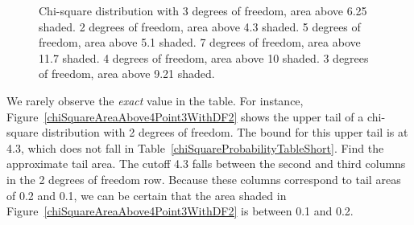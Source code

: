 \begin{figure}
{}
\caption{\textbf{} Chi-square distribution with 3 degrees of freedom, area above 6.25 shaded. \textbf{} 2 degrees of freedom, area above 4.3 shaded. \textbf{} 5 degrees of freedom, area above 5.1 shaded. \textbf{} 7 degrees of freedom, area above 11.7 shaded. \textbf{} 4 degrees of freedom, area above 10 shaded. \textbf{} 3 degrees of freedom, area above 9.21 shaded.}
\label{arrayOfFigureAreasForChiSquareDistribution}
\end{figure}

\begin{example}{We rarely observe the \emph{exact} value in the table. For instance, Figure~\ref{chiSquareAreaAbove4Point3WithDF2} shows the upper tail of a chi-square distribution with 2 degrees of freedom. The bound for this upper tail is at 4.3, which does not fall in Table~\ref{chiSquareProbabilityTableShort}. Find the approximate tail area.}
The cutoff 4.3 falls between the second and third columns in the 2 degrees of freedom row. Because these columns correspond to tail areas of 0.2 and 0.1, we can be certain that the area shaded in Figure~\ref{chiSquareAreaAbove4Point3WithDF2} is between 0.1 and 0.2.
\end{example}

